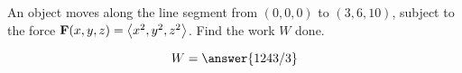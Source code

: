 \documentclass{ximera}
\author{David Guichard \and Neal Koblitz \and H. Jerome Keisler \and Albert Scheller \and Barry Balof \and Mike Wills \and Matthew Carr}
\begin{document}
\begin{exercise}




An object moves along the line segment from $(0,0,0)$ to $(3,6,10)$, subject to the force $\mathbf{F}(x,y,z)=\left\langle x^2,y^2,z^2\right\rangle$. Find the work $W$ done.

\begin{prompt}
\[
W=\answer{1243/3}
\]
\end{prompt}



\end{exercise}
\end{document}
